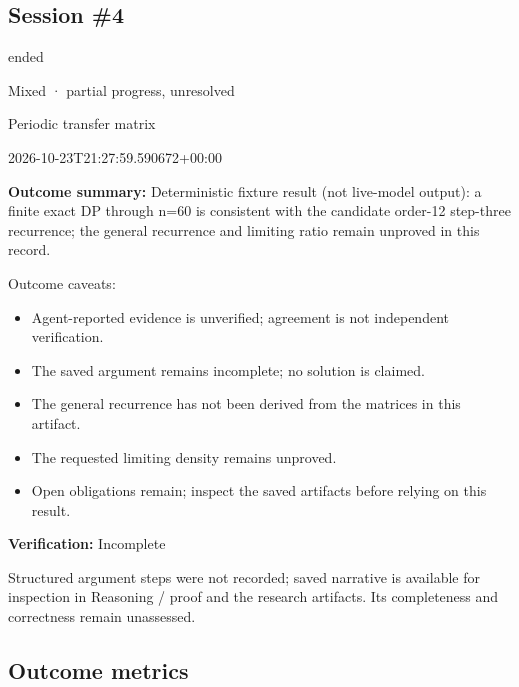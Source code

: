 \documentclass[11pt]{article}
\begin{document}
\subsection{Session \#4}
\begin{description}[style=nextline,font=\normalfont\bfseries,leftmargin=0pt,labelsep=0pt]
\item[Execution status] ended
\item[Outcome] Mixed · partial progress, unresolved
\item[Strategy] Periodic transfer matrix
\item[Started] 2026-10-23T21:27:59.590672+00:00
\end{description}
\textbf{Outcome summary:} Deterministic fixture result (not live-model output): a finite exact DP through n=60 is consistent with the candidate order-12 step-three recurrence; the general recurrence and limiting ratio remain unproved in this record.\par
Outcome caveats:\par
\begin{itemize}
\item Agent-reported evidence is unverified; agreement is not independent verification.
\item The saved argument remains incomplete; no solution is claimed.
\item The general recurrence has not been derived from the matrices in this artifact.
\item The requested limiting density remains unproved.
\item Open obligations remain; inspect the saved artifacts before relying on this result.
\end{itemize}
\textbf{Verification:} Incomplete\par
Structured argument steps were not recorded; saved narrative is available for inspection in Reasoning / proof and the research artifacts. Its completeness and correctness remain unassessed.\par
\subsection{Outcome metrics}
\end{document}
